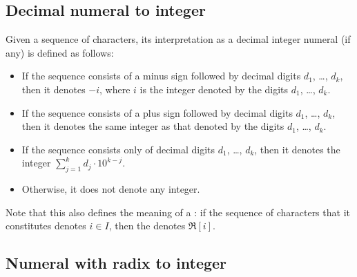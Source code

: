 \subsection{Decimal numeral to integer}

\label{section:numeral-to-integer}
Given a sequence of characters, its interpretation as a decimal integer numeral
(if any) is defined as follows:
\begin{itemize}
\item If the sequence consists of a minus sign followed by decimal digits $d_1$, \ldots, $d_k$,
then it denotes $-i$, where $i$ is the integer denoted by the digits $d_1$, \ldots, $d_k$.
\item If the sequence consists of a plus sign followed by decimal digits $d_1$, \ldots, $d_k$,
then it denotes the same integer as that denoted by the digits $d_1$, \ldots, $d_k$.
\item If the sequence consists only of decimal digits $d_1$, \ldots, $d_k$, then it
denotes the integer $\sum_{j=1}^k d_j\cdot10^{k-j}$.
\item Otherwise, it does not denote any integer.
\end{itemize}
Note that this also defines the meaning of a
:
if the sequence of characters
that it constitutes denotes $i\in I$, then the  denotes $\Re[i]$.

\subsection{Numeral with radix to integer}

